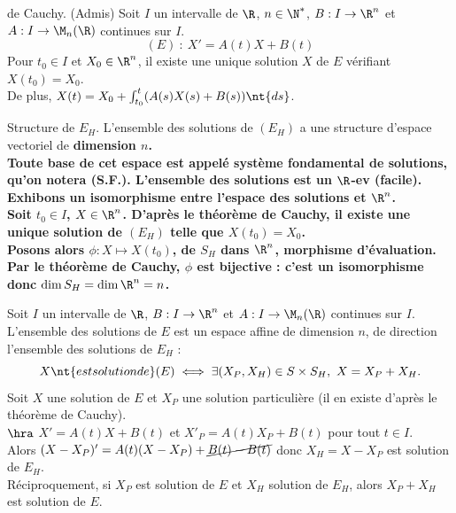 \documentclass[11pt]{article}
\begin{document}
\begin{thm}{de Cauchy. (Admis)}{}
    Soit $I$ un intervalle de $\R$, $n\in\N^*$, $B:I\to\R^n$ et $A:I\to\M_n(\R)$ continues sur $I$.
    \begin{equation*}
        (E) ~ : ~ X' = A(t)X + B(t)
    \end{equation*}
    Pour $t_0\in I$ et $X_0\in\R^n$, il existe une unique solution $X$ de $E$ vérifiant $X(t_0)=X_0$.\\
    De plus, $X(t)=X_0+\int_{t_0}^t (A(s)X(s)+B(s))\nt{ds}$.
\end{thm}

\begin{prop}{Structure de $E_H$.}{}
    L'ensemble des solutions de $(E_H)$ a une structure d'espace vectoriel de \bf{dimension $n$}.\\
    Toute base de cet espace est appelé \bf{système fondamental de solutions}, qu'on notera (S.F.).
    \tcblower
    L'ensemble des solutions est un $\R$-ev (facile). Exhibons un isomorphisme entre l'espace des solutions et $\R^n$.\\
    Soit $t_0\in I$, $X\in\R^n$. D'après le théorème de Cauchy, il existe une unique solution de $(E_H)$ telle que $X(t_0)=X_0$.\\
    Posons alors $\phi:X\mapsto X(t_0)$, de $S_H$ dans $\R^n$, morphisme d'évaluation.\\
    Par le théorème de Cauchy, $\phi$ est bijective : c'est un isomorphisme donc $\dim S_H = \dim \R^n = n$.
\end{prop}

\begin{prop}{}{}
    Soit $I$ un intervalle de $\R$, $B:I\to\R^n$ et $A:I\to\M_n(\R)$ continues sur $I$.\\
    L'ensemble des solutions de $E$ est un espace affine de dimension $n$, de direction l'ensemble des solutions de $E_H$ :
    \begin{equation*}
        X \nt{ est solution de } (E) \iff \exists (X_P, X_H) \in S\times S_H, ~ X = X_P + X_H.
    \end{equation*}
    \tcblower
    Soit $X$ une solution de $E$ et $X_P$ une solution particulière (il en existe d'après le théorème de Cauchy).\\
    $\hra$ $X' = A(t)X + B(t)$ et $X'_P = A(t)X_P + B(t)$ pour tout $t \in I$.\\
    Alors $(X-X_P)' = A(t)(X-X_P) + \cancel{B(t) - B(t)}$ donc $X_H=X-X_P$ est solution de $E_H$.\\
    Réciproquement, si $X_P$ est solution de $E$ et $X_H$ solution de $E_H$, alors $X_P+X_H$ est solution de $E$.
\end{prop}
\end{document}

